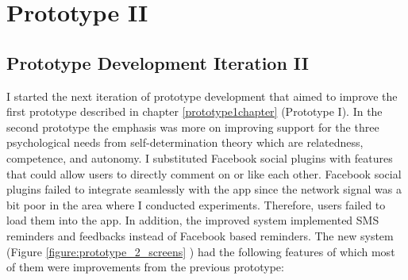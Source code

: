 
\chapter{Prototype II} %

\label{prototype2chapter} %


\section{Prototype Development Iteration II}
I started the next iteration of prototype development that aimed to improve the first prototype described in chapter \ref{prototype1chapter} (Prototype I). In the second prototype the emphasis was more on improving support for the three psychological needs from self-determination theory \citep{ryan2000:self} which are relatedness, competence, and autonomy. I substituted Facebook social plugins with features that could allow users to directly comment on or like each other. Facebook social plugins failed to integrate seamlessly with the app since the network signal was a bit poor in the area where I conducted experiments. Therefore, users failed to load them into the app. In addition, the improved system implemented SMS reminders and feedbacks instead of Facebook based reminders. The new system (Figure \ref{figure:prototype_2_screens} ) had the following features of which most of them were improvements from the previous prototype:
